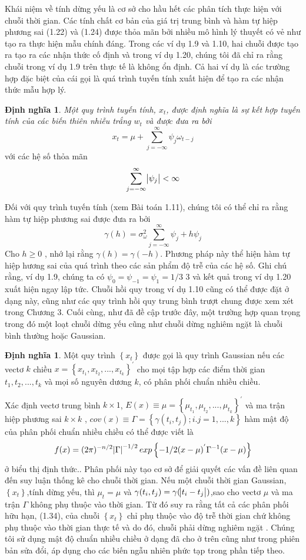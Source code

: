 \documentclass[12pt, a4paper,oneside]{book}
\theoremstyle{definition}
\newtheorem{dn}[theo]{Định nghĩa}
\begin{document}
Khái niệm về tính dừng yếu là cơ sở cho hầu hết các phân tích thực hiện với chuỗi thời gian. Các tính chất cơ bản của giá trị trung bình và hàm tự hiệp phương sai (1.22) và (1.24) được thỏa mãn bởi nhiều mô hình lý thuyết có vẻ như tạo ra thực hiện mẫu chính đáng. Trong các ví dụ 1.9 và 1.10, hai chuỗi được tạo ra tạo ra các nhận thức cố định và trong ví dụ 1.20, chúng tôi đã chỉ ra rằng chuỗi trong ví dụ 1.9 trên thực tế là không ổn định. Cả hai ví dụ là các trường hợp đặc biệt của cái gọi là quá trình tuyến tính xuất hiện để tạo ra các nhận thức mẫu hợp lý.
\begin{dn}	
	\textit{Một quy trình tuyến tính, $x_{t}$, được định nghĩa là sự kết hợp tuyến tính của các biến thiên nhiễu trắng $w_{t}$ và được đưa ra bởi} 
	$$ x_{t}=\mu+\sum_{j=-\infty}^{\infty}\psi_{j}\omega_{t-j}  $$ 
	với các hệ số thỏa mãn
	$$ \sum_{j=-\infty}^{\infty}\abs{\psi_{j}}<\infty $$
\end{dn}
Đối với quy trình tuyến tính (xem Bài toán 1.11), chúng tôi có thể chỉ ra rằng hàm tự hiệp phương sai được đưa ra bởi
$$ \gamma(h)=\sigma_{\omega}^2 \sum_{j=-\infty}^{\infty}\psi_{j}+h\psi_{j} $$
Cho $ h\geqslant0 $ , nhớ lại rằng $\gamma(h)=\gamma(-h)$. Phương pháp này thể hiện hàm tự hiệp hương sai của quá trình theo các sản phẩm độ trễ của các hệ số. Ghi chú rằng, ví dụ 1.9, chúng ta có $ \psi_{0}=\psi_{-1}=\psi_{1}=1/3 $ 3 và kết quả trong ví dụ 1.20 xuất hiện ngay lập tức. Chuỗi hồi quy trong ví dụ 1.10 cũng có thể được đặt ở dạng này, cũng như các quy trình hồi quy trung bình trượt chung được xem xét trong Chương 3. 
Cuối cùng, như đã đề cập trước đây, một trường hợp quan trọng trong đó một loạt chuỗi dừng yếu cũng như chuỗi dừng nghiêm ngặt là chuỗi  bình thường hoặc Gaussian.
\begin{dn}
	Một quy trình $ \left\lbrace x_{t}\right\rbrace  $ được gọi là quy trình Gaussian nếu các vectơ $ k $ chiều $ x=\left\lbrace x_{t_{1}}, x_{t_{2}}, ..., x_{t_{k}}\right\rbrace^{'} $ cho mọi tập hợp các điểm thời gian $t_{1},t_{2},...,t_{k}$ và mọi số nguyên dương $ k $, có phân phối chuẩn nhiều chiều.
\end{dn}
Xác định vectơ trung bình $ k \times 1 $, $E(x)\equiv\mu=\left\lbrace \mu_{t_{1}}, \mu_{t_{2}}, ..., \mu_{t_{k}}\right\rbrace^{'}$ và ma trận hiệp phương sai $ k \times k $ , $ cov(x)\equiv\Gamma=\left\lbrace \gamma(t_{i},t_{j});i.j=1,...,k\right\rbrace $
hàm mật độ của phân phối chuẩn nhiều chiều có thể được viết là
$$ f(x)=(2\pi)^{-n/2}\abs{\Gamma}^{-1/2}exp \left\lbrace-1/2(x-\mu)^{'}\Gamma^{-1}(x-\mu)\right\rbrace  $$
ở \abs{\cdot} biểu thị định thức.. Phân phối này tạo cơ sở để giải quyết các vấn đề liên quan đến suy luận thống kê cho chuỗi thời gian. Nếu một chuỗi thời gian Gaussian, $ \left\lbrace x_{t}\right\rbrace  $,tính dừng yếu, thì $ \mu_{t}=\mu $ và $\gamma(t_{i},t_{j})=\gamma(\abs{t_{i}-t_{j}}) $,sao cho vectơ $ \mu $ và ma trận $ \Gamma $ không phụ thuộc vào thời gian. Từ đó suy ra rằng tất cả các phân phối hữu hạn, (1.34), của chuỗi $ \left\lbrace x_{t}\right\rbrace  $ chỉ phụ thuộc vào độ trễ thời gian chứ không phụ thuộc vào thời gian thực tế và do đó, chuỗi phải  dừng nghiêm ngặt . Chúng tôi sử dụng mật độ chuẩn nhiều chiều ở dạng đã cho ở trên cũng như trong phiên bản sửa đổi, áp dụng cho các biến ngẫu nhiên phức tạp trong phần tiếp theo.
\end{document}
